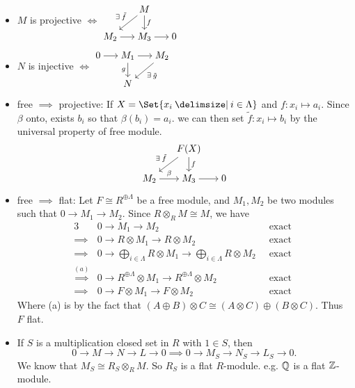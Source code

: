 \begin{fact} \mbox{}
  \begin{itemize}
    \item $M$ is projective $\iff$
      $\begin{tikzcd}[cramped, sep=15pt]
         & M \ar[dl, "\exists \tilde f"'] \ar[d, "f"] \\
        M_2 \ar[r] & M_3 \ar[r] & 0
      \end{tikzcd}$
    \item $N$ is injective $\iff$
      $\begin{tikzcd}[cramped, sep=15pt]
        0 \ar[r] & M_1 \ar[d, "g"'] \ar[r] & M_2 \ar[dl, "\exists \tilde g"] \\
         & N
      \end{tikzcd}$
    \item free $\implies$ projective:
      If $X = \Set{ x_i \given i \in \Lambda}$ and $f: x_i \mapsto a_i$.
      Since $\beta$ onto, exists $b_i$ so that $\beta(b_i) = a_i$.
      we can then set $\tilde f: x_i \mapsto b_i$ by the universal
      property of free module.
      \[\begin{tikzcd}[cramped, sep=15pt]
        & F(X) \ar[dl, "\exists \tilde f"'] \ar[d, "f"] \\
        M_2 \ar[r, "\beta"] & M_3 \ar[r] & 0
      \end{tikzcd}\]
    \item free $\implies$ flat:
      Let $F \cong R^{\oplus \Lambda}$ be a free module,
      and $M_1, M_2$ be two modules such that $0 \to M_1 \to M_2$.
      Since $R \otimes_R M \cong M$, we have
      \begin{alignat*}{3}
        & 0 \to M_1 \to M_2 & \text{ exact } \\
        \implies & 0 \to R \otimes M_1 \to R \otimes M_2 & \text{ exact } \\
        \implies & 0 \to \bigoplus_{i \in \Lambda} R \otimes M_1 \to
        \bigoplus_{i \in \Lambda} R \otimes M_2 \ & \text{ exact } \\
        \stackrel{(a)}{\implies} & 0 \to R^{\oplus \Lambda} \otimes M_1 \to
        R^{\oplus \Lambda} \otimes M_2 & \text{ exact } \\
        \implies & 0 \to F \otimes M_1 \to F \otimes M_2 & \text{ exact }
      \end{alignat*}
      Where (a) is by the fact that $(A \oplus B) \otimes C \cong
      (A\otimes C) \oplus (B \otimes C)$. Thus $F$ flat.

    \item If $S$ is a multiplication closed set in $R$ with $1 \in S$, then
      \[ 0 \to M \to N \to L \to 0 \implies 0 \to M_S \to N_S \to L_S \to 0. \]
      We know that $M_S \cong R_S \otimes_R M$. So $R_S$ is a flat $R$-module.
      e.g. $\mathbb{Q}$ is a flat $\mathbb{Z}$-module.
  \end{itemize}
\end{fact}

